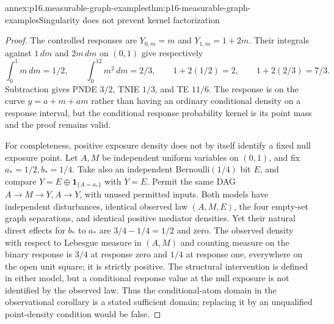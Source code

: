 \begin{annexitem}{annex:p16.measurable-graph-examples}{thm:p16-measurable-graph-examples}{Singularity does not prevent kernel factorization}
\begin{proof}
The controlled responses are \(Y_{0,m}=m\) and \(Y_{1,m}=1+2m\).
Their integrals against \(1\,dm\) and \(2m\,dm\) on \((0,1)\)
give respectively
\[
 \int_0^1m\,dm=1/2,\qquad \int_0^12m^2\,dm=2/3,
 \qquad1+2(1/2)=2,\qquad1+2(2/3)=7/3.
\]
Subtraction gives PNDE \(3/2\), TNIE \(1/3\), and TE \(11/6\).
The response is on the curve \(y=a+m+am\) rather than having
an ordinary conditional density on a response interval, but the
conditional response probability kernel is its point mass and
the proof remains valid.

For completeness, positive exposure density does not by itself
identify a fixed null exposure point. Let \(A,M\) be independent
uniform variables on \((0,1)\), and fix \(a_*=1/2,b_*=1/4\).
Take also an independent Bernoulli\((1/4)\) bit \(E\), and compare
\(Y=E\oplus\mathbf1_{\{A=a_*\}}\) with \(Y=E\).
Permit the same DAG \(A\to M\to Y,A\to Y\), with
unused permitted inputs. Both models have independent disturbances,
identical observed law \((A,M,E)\), the four empty-set graph
separations, and identical positive mediator densities. Yet their
natural direct effects for \(b_*\) to \(a_*\) are \(3/4-1/4=1/2\)
and zero. The observed density with respect to Lebesgue measure in
\((A,M)\) and counting measure on the binary response is \(3/4\)
at response zero and \(1/4\) at response one, everywhere on the
open unit square; it is strictly positive.
The structural intervention is defined in either model, but a
conditional response value at the null exposure is not identified
by the observed law. Thus the conditional-atom domain in the
observational corollary is a stated sufficient domain; replacing
it by an unqualified point-density condition would be false.
\end{proof}
\end{annexitem}
